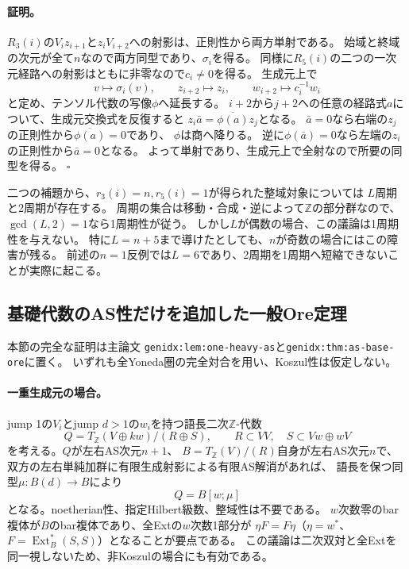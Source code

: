 \documentclass[11pt,a4paper]{ltjsarticle}
\newcommand{\Ext}{\operatorname{Ext}}
\begin{document}
\paragraph{証明。}
$R_3(i)$の$V_i z_{i+1}$と$z_iV_{i+2}$への射影は、正則性から両方単射である。
始域と終域の次元が全て$n$なので両方同型であり、$\sigma_i$を得る。
同様に$R_5(i)$の二つの一次元経路への射影はともに非零なので$c_i\ne0$を得る。
生成元上で
\[
v\mapsto\sigma_i(v),\qquad z_{i+2}\mapsto z_i,
\qquad w_{i+2}\mapsto c_i^{-1}w_i
\]
と定め、テンソル代数の写像$\phi$へ延長する。
$i+2$から$j+2$への任意の経路式$a$について、生成元交換式を反復すると
$z_i\bar a=\overline{\phi(a)}z_j$となる。
$\bar a=0$なら右端の$z_j$の正則性から$\overline{\phi(a)}=0$であり、
$\phi$は商へ降りる。
逆に$\phi(\bar a)=0$なら左端の$z_i$の正則性から$\bar a=0$となる。
よって単射であり、生成元上で全射なので所要の同型を得る。
\hfill$\square$



二つの補題から、$r_3(i)=n,r_5(i)=1$が得られた整域対象については
$L$周期と2周期が存在する。
周期の集合は移動・合成・逆によって$\mathbb Z$の部分群なので、
$\gcd(L,2)=1$なら1周期性が従う。
しかし$L$が偶数の場合、この議論は1周期性を与えない。
特に$L=n+5$まで導けたとしても、$n$が奇数の場合にはこの障害が残る。
前述の$n=1$反例では$L=6$であり、2周期を1周期へ短縮できないことが実際に起こる。

\subsection{基礎代数のAS性だけを追加した一般Ore定理}
\label{note:one-heavy-frobenius}
\label{note:as-base-ore}
本節の完全な証明は主論文
\texttt{genidx:lem:one-heavy-as}と\texttt{genidx:thm:as-base-ore}に置く。
いずれも全Yoneda圏の完全対合を用い、Koszul性は仮定しない。

\paragraph{一重生成元の場合。}
jump 1の$V_i$とjump $d>1$の$w_i$を持つ語長二次$\mathbb Z$-代数
\[
Q=T_{\mathbb Z}(V\oplus kw)/(R\oplus S),\qquad
R\subset VV,\quad S\subset Vw\oplus wV
\]
を考える。$Q$が左右AS次元$n+1$、
$B=T_{\mathbb Z}(V)/(R)$自身が左右AS次元$n$で、
双方の左右単純加群に有限生成射影による有限AS解消があれば、
語長を保つ同型$\mu:B(d)\to B$により
\[
Q=B[w;\mu]
\]
となる。noetherian性、指定Hilbert級数、整域性は不要である。
$w$次数零のbar複体が$B$のbar複体であり、全Extの$w$次数1部分が
$\eta F=F\eta$（$\eta=w^*$、$F=\Ext_B^*(S,S)$）となることが要点である。
この議論は二次双対と全Extを同一視しないため、非Koszulの場合にも有効である。
\end{document}
